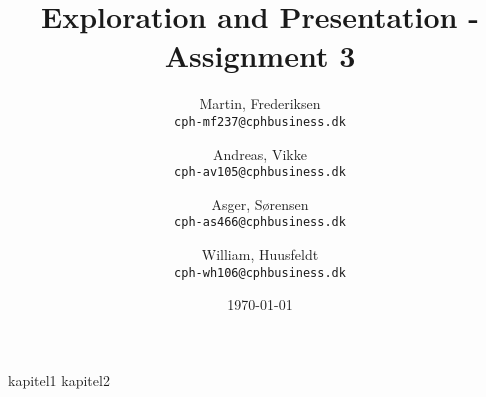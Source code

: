 \documentclass[10pt]{report}
\title{Exploration and Presentation - Assignment 3}
\author{
    Martin, Frederiksen\\
    \texttt{cph-mf237@cphbusiness.dk}\\
    \and
    Andreas, Vikke\\
    \texttt{cph-av105@cphbusiness.dk}\\
    \and
    Asger, Sørensen\\
    \texttt{cph-as466@cphbusiness.dk}\\
    \and
    William, Huusfeldt\\
    \texttt{cph-wh106@cphbusiness.dk}\\
  }
\date{\today}
\begin{document}
\hypersetup{pageanchor=false}
\begin{titlepage}
\maketitle
\end{titlepage}

\hypersetup{pageanchor=true}
\tableofcontents
{kapitel1}
{kapitel2}
\end{document}
